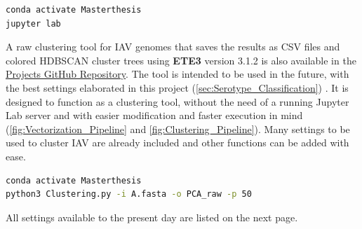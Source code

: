 \begin{lstlisting}[language=sh]
conda activate Masterthesis
jupyter lab
\end{lstlisting}  

A raw clustering tool for \gls{IAV} genomes that saves the results as CSV files and colored \gls{HDBSCAN} cluster trees using \textbf{ETE3} version 3.1.2 is also available in the \href{https://github.com/ahenoch/Masterthesis.git}{Projects GitHub Repository}. The tool is intended to be used in the future, with the best settings elaborated in this project (\autoref{sec:Serotype_Classification}) \autocite{huerta-cepas_ete_2016}. It is designed to function as a clustering tool, without the need of a running Jupyter Lab server and with easier modification and faster execution in mind (\autoref{fig:Vectorization_Pipeline} and \autoref{fig:Clustering_Pipeline}). Many settings to be used to cluster \gls{IAV} are already included and other functions can be added with ease.

\begin{lstlisting}[language=sh]
conda activate Masterthesis
python3 Clustering.py -i A.fasta -o PCA_raw -p 50
\end{lstlisting}  

All settings available to the present day are listed on the next page.

